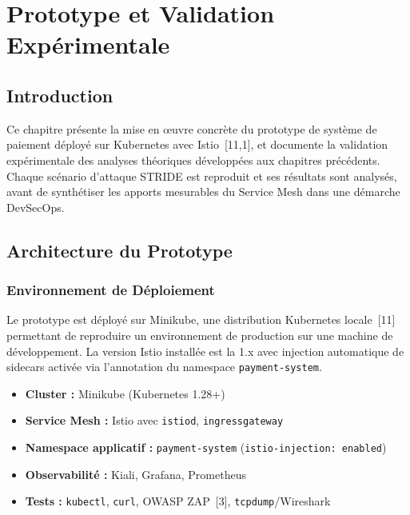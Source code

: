 \chapter{Prototype et Validation Expérimentale}
\section*{Introduction}
\label{sec:introduction-ch4}
Ce chapitre présente la mise en œuvre concrète du prototype de système de
paiement déployé sur Kubernetes avec Istio~[11,1], et documente la validation
expérimentale des analyses théoriques développées aux chapitres précédents.
Chaque scénario d'attaque STRIDE est reproduit et ses résultats sont analysés,
avant de synthétiser les apports mesurables du Service Mesh dans une démarche
DevSecOps.

\section{Architecture du Prototype}

\subsection{Environnement de Déploiement}

Le prototype est déployé sur Minikube, une distribution Kubernetes locale~[11]
permettant de reproduire un environnement de production sur une machine de
développement. La version Istio installée est la 1.x avec injection automatique
de sidecars activée via l'annotation du namespace \texttt{payment-system}.

\begin{itemize}
  \item \textbf{Cluster :} Minikube (Kubernetes 1.28+)
  \item \textbf{Service Mesh :} Istio avec \texttt{istiod}, \texttt{ingressgateway}
  \item \textbf{Namespace applicatif :} \texttt{payment-system}
    (\texttt{istio-injection: enabled})
  \item \textbf{Observabilité :} Kiali, Grafana, Prometheus
  \item \textbf{Tests :} \texttt{kubectl}, \texttt{curl}, OWASP ZAP~[3],
    \texttt{tcpdump}/Wireshark
\end{itemize}

